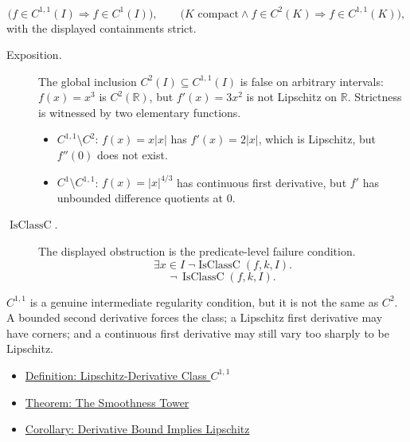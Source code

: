 \begin{remark*}
\[
  \bigl(f\in C^{1,1}(I)\Rightarrow f\in C^1(I)\bigr),
  \qquad
  \bigl(K\text{ compact}\land f\in C^2(K)\Rightarrow f\in C^{1,1}(K)\bigr),
\]
with the displayed containments strict.
\end{remark*}

\begin{remark*}
\begin{description}
  \item[Exposition.]
The global inclusion \(C^2(I)\subseteq C^{1,1}(I)\) is false on arbitrary
intervals: \(f(x)=x^3\) is \(C^2(\mathbb{R})\), but
\(f'(x)=3x^2\) is not Lipschitz on \(\mathbb{R}\). Strictness is witnessed by
two elementary functions.
\begin{itemize}
  \item \(C^{1,1}\setminus C^2\): \(f(x)=x|x|\) has \(f'(x)=2|x|\), which is
        Lipschitz, but \(f''(0)\) does not exist.
  \item \(C^1\setminus C^{1,1}\): \(f(x)=|x|^{4/3}\) has continuous first
        derivative, but \(f'\) has unbounded difference quotients at \(0\).
\end{itemize}


  \item[\(\operatorname{IsClassC}.\)]
  The displayed obstruction is the predicate-level failure condition.
  \[
  \exists x\in I\;\neg\operatorname{IsClassC}(f,k,I).
  \]
  \[
  \neg\,\operatorname{IsClassC}(f,k,I).
  \]
\end{description}
\end{remark*}

\begin{remark*}[Interpretation]
\(C^{1,1}\) is a genuine intermediate regularity condition, but it is not
the same as \(C^2\). A bounded second derivative forces the class; a
Lipschitz first derivative may have corners; and a continuous first
derivative may still vary too sharply to be Lipschitz.
\end{remark*}

\begin{dependencies}
\begin{itemize}
  \item \hyperref[def:class-c11]{Definition: Lipschitz-Derivative Class \(C^{1,1}\)}
  \item \hyperref[thm:smoothness-tower]{Theorem: The Smoothness Tower}
  \item \hyperref[cor:derivative-bound-implies-lipschitz]{Corollary: Derivative Bound Implies Lipschitz}
\end{itemize}
\end{dependencies}

